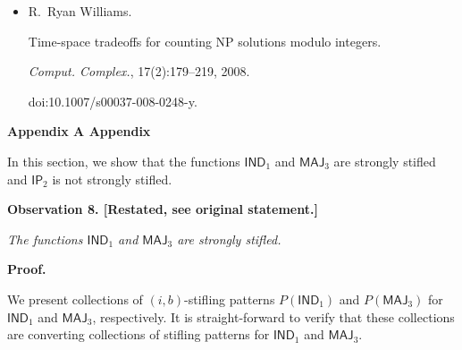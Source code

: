 \documentclass[10pt,a4paper]{article}
\begin{document}
\begin{itemize}
doi:10.1007/978-3-319-58747-9\_26.





\item[] 
[26]

R. Ryan Williams.


Time-space tradeoffs for counting NP solutions modulo integers.


\emph{Comput. Complex.}, 17(2):179–219, 2008.


doi:10.1007/s00037-008-0248-y.





\end{itemize}




\par\medskip\noindent\textbf{
Appendix A Appendix}\par




In this section, we show that the functions $\mathsf{IND}_{1}$ and $\mathsf{MAJ}_{3}$ are strongly stifled and $\mathsf{IP}_{2}$ is not strongly stifled.\par






\par\medskip\noindent\textbf{
\textbf{Observation 8}\textbf{.}
[Restated, see original statement.]}\par



\emph{The functions $\mathsf{IND}_{1}$ and $\mathsf{MAJ}_{3}$ are strongly stifled.}\par







\par\medskip\noindent\textbf{Proof.}\par




We present collections of $(i,b)$-stifling patterns $P(\mathsf{IND}_{1})$ and $P(\mathsf{MAJ}_{3})$ for $\mathsf{IND}_{1}$ and $\mathsf{MAJ}_{3}$, respectively.
It is straight-forward to verify that these collections are converting collections of stifling patterns for $\mathsf{IND}_{1}$ and $\mathsf{MAJ}_{3}$.\par
\end{document}
